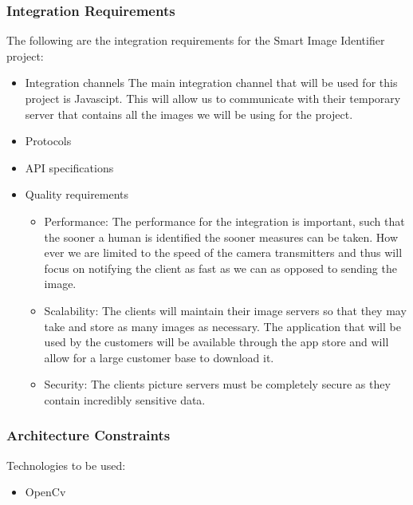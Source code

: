 \documentclass[a4paper,12pt]{report}
\begin{document}
 \subsubsection{Integration Requirements}
 The following are the integration requirements for the Smart Image Identifier project:
 	\begin{itemize}
 		\item Integration channels The main integration channel that will be used for this project is Javascipt. This will allow us to communicate with their temporary server that contains all the images we will be using for the project.
 	\end{itemize}
	\begin{itemize}
 		\item Protocols
	\end{itemize}
	\begin{itemize}
 		\item API specifications
	\end{itemize}
	\begin{itemize}
 		\item Quality requirements
			\begin{itemize}
				\item Performance: The performance for the integration is important, such that the sooner a human is identified the sooner measures can be taken. How ever we are limited to the speed of the camera transmitters and thus will focus on notifying the client as fast as we can as opposed to sending the image.
				\item Scalability: The clients will maintain their image servers so that they may take and store as many images as necessary. The application that will be used by the customers will be available through the app store and will allow for a large customer base to download it.
				\item Security: The clients picture servers must be completely secure as they contain incredibly sensitive data.
			\end{itemize}
	\end{itemize}
	
 \subsubsection{Architecture Constraints}
	Technologies to be used:
		\begin{itemize}
			\item OpenCv
			\\
		\end{itemize}
\newpage
\end{document}
